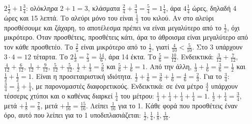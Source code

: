  $2\frac{1}{2}+1\frac{3}{4}$: ολόκληρα $2+1=3$, κλάσματα $\frac{2}{4}+\frac{3}{4}=\frac{5}{4}=1\frac{1}{4}$, άρα $4\frac{1}{4}$ ώρες, δηλαδή 4 ώρες και 15 λεπτά.
 Το αλεύρι μόνο του είναι $\frac{1}{2}$ του κιλού. Αν στο αλεύρι προσθέσουμε και ζάχαρη, το αποτέλεσμα πρέπει να είναι μεγαλύτερο από το $\frac{1}{2}$, όχι μικρότερο. Όταν προσθέτεις, προσθέτεις κάτι, άρα το άθροισμα είναι μεγαλύτερο από τον κάθε προσθετέο. Το $\frac{2}{5}$ είναι μικρότερο από το $\frac{1}{2}$, γιατί $\frac{4}{10}<\frac{5}{10}$.
 Στο 3 υπάρχουν $3\cdot 4=12$ τέταρτα. Το $2\frac{1}{3}=\frac{7}{3}=\frac{14}{6}$, άρα 14 έκτα.
 Το $\frac{5}{6}=\frac{10}{12}$. Ενδεικτικά: $\frac{3}{12}+\frac{7}{12}$, $\frac{4}{12}+\frac{6}{12}$, $\frac{1}{12}+\frac{9}{12}$, $\frac{5}{12}+\frac{5}{12}$.
 $\frac{1}{2}+\frac{1}{3}=\frac{5}{6}$ και $\frac{5}{6}+\frac{1}{6}=1$. Από την άλλη, $\frac{1}{3}+\frac{1}{6}=\frac{3}{6}=\frac{1}{2}$ και $\frac{1}{2}+\frac{1}{2}=1$. Είναι η προσεταιριστική ιδιότητα.
 $\frac{1}{2}+\frac{1}{6}=\frac{3}{6}+\frac{1}{6}=\frac{4}{6}=\frac{2}{3}$. Για το $\frac{3}{4}$: $\frac{3}{4}=\frac{1}{2}+\frac{1}{4}$, με παρονομαστές διαφορετικούς.
 Ενδεικτικά: σε ένα μέτρο $\frac{4}{4}$ υπάρχουν τέσσερις χτύποι και ο καθένας διαρκεί $\frac{1}{4}$ του μέτρου: $\frac{1}{4}+\frac{1}{4}+\frac{1}{4}+\frac{1}{4}=1$.
 $\frac{1}{2}+\frac{1}{4}=\frac{3}{4}$, μετά $+\frac{1}{8}=\frac{7}{8}$, μετά $+\frac{1}{16}=\frac{15}{16}$. Λείπει $\frac{1}{16}$ για το 1. Κάθε φορά που προσθέτεις έναν όρο, αυτό που λείπει για το 1 υποδιπλασιάζεται: $\frac{1}{2},\frac{1}{4},\frac{1}{8},\frac{1}{16}$.
